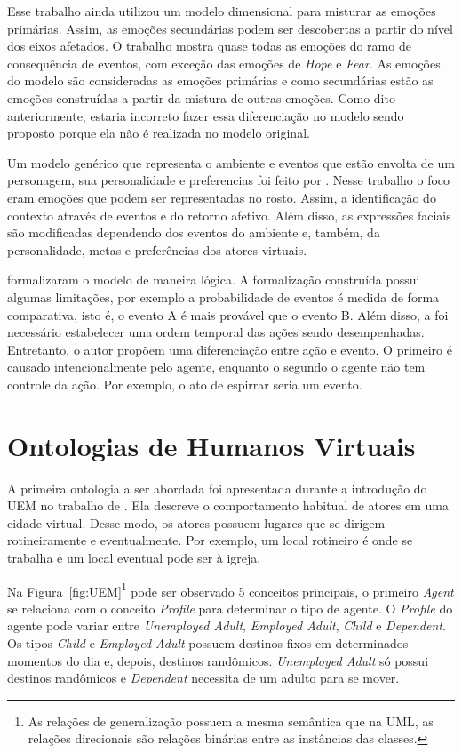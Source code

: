 Esse trabalho ainda utilizou um modelo dimensional para misturar as emoções
primárias. Assim, as emoções secundárias podem ser descobertas a partir do
nível dos eixos afetados. O trabalho mostra quase todas as emoções do
ramo de consequência de eventos, com exceção das emoções de \emph{Hope} e
\emph{Fear}. As emoções do modelo \occ são consideradas as
emoções primárias e como secundárias estão as emoções construídas a partir da
mistura de outras emoções. Como dito anteriormente, estaria incorreto fazer
essa diferenciação no modelo sendo proposto porque ela não é realizada no
modelo \occ original.

Um modelo genérico que representa o ambiente e eventos que estão envolta de um
personagem, sua personalidade e preferencias foi feito por
\citet{lera2009semantic}. Nesse trabalho o foco eram emoções que podem ser
representadas no rosto. Assim, a identificação do contexto através de eventos
e do retorno afetivo. Além disso, as expressões faciais são modificadas
dependendo dos eventos do ambiente e, também, da personalidade, metas e
preferências dos atores virtuais.

\citet{adam2009alfototoe} formalizaram o modelo \occ de maneira lógica. A
formalização construída possui algumas limitações, por exemplo a probabilidade
de eventos é medida de forma comparativa, isto é, o evento A é mais provável
que o evento B. Além disso, a foi necessário estabelecer uma ordem temporal
das ações sendo desempenhadas.  Entretanto, o autor propõem uma diferenciação
entre ação e evento. O primeiro é causado intencionalmente pelo agente\dev{},
enquanto o segundo o agente não tem controle da ação. Por exemplo, o ato de
espirrar seria um evento.

\section{Ontologias de Humanos Virtuais} \label{cap:eda:odhv}

A primeira ontologia a ser abordada foi apresentada durante a introdução do
UEM no trabalho de \citet{paiva2005ontology}. Ela descreve o comportamento
habitual de atores em uma cidade virtual. Desse modo, os atores possuem
lugares que se dirigem rotineiramente e eventualmente. Por exemplo, um local
rotineiro é onde se trabalha e um local eventual pode ser à igreja.

Na Figura~\ref{fig:UEM}\footnote{As relações de generalização possuem a mesma
semântica que na UML, as relações direcionais são relações binárias entre as
instâncias das classes.} pode ser observado 5 conceitos principais, o primeiro
\emph{Agent} se relaciona com o conceito \emph{Profile} para determinar o tipo
de agente. O \emph{Profile} do agente pode variar entre \emph{Unemployed Adult},
\emph{Employed Adult}, \emph{Child} e \emph{Dependent}. Os tipos \emph{Child}
e \emph{Employed Adult} possuem destinos fixos em determinados momentos do dia
e, depois, destinos randômicos. \emph{Unemployed Adult} só possui destinos
randômicos e \emph{Dependent} necessita de um adulto para se mover.

